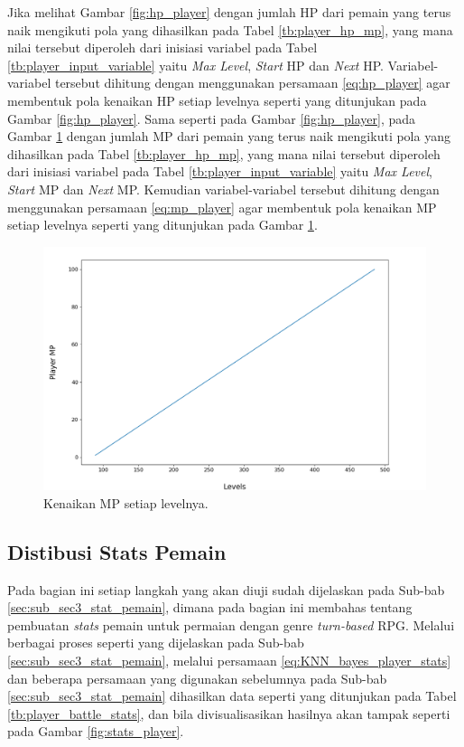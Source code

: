 Jika melihat Gambar \ref{fig:hp_player} dengan jumlah HP dari pemain yang terus naik mengikuti pola yang dihasilkan pada Tabel \ref{tb:player_hp_mp}, yang mana nilai tersebut diperoleh dari inisiasi variabel pada Tabel \ref{tb:player_input_variable} yaitu \textit{Max Level}, \textit{Start} HP dan \textit{Next} HP. Variabel-variabel tersebut dihitung dengan menggunakan persamaan \ref{eq:hp_player} agar membentuk pola kenaikan HP setiap levelnya seperti yang ditunjukan pada Gambar \ref{fig:hp_player}. Sama seperti pada Gambar \ref{fig:hp_player}, pada Gambar \ref{fig:mp_player} dengan jumlah MP dari pemain yang terus naik mengikuti pola yang dihasilkan pada Tabel \ref{tb:player_hp_mp}, yang mana nilai tersebut diperoleh dari inisiasi variabel pada Tabel \ref{tb:player_input_variable} yaitu \textit{Max Level}, \textit{Start} MP dan \textit{Next} MP. Kemudian variabel-variabel tersebut dihitung dengan menggunakan persamaan \ref{eq:mp_player} agar membentuk pola kenaikan MP setiap levelnya seperti yang ditunjukan pada Gambar \ref{fig:mp_player}.

\begin{figure} [!h] \centering
	\includegraphics[scale=0.45]{img/PlayerMpDistrib.png}
	\caption{Kenaikan MP setiap levelnya.}
	\label{fig:mp_player}
\end{figure}
\vspace{1ex}

\subsection{Distibusi Stats Pemain}
\label{sec:sub_sec4_pengujian_player_stats}
\vspace{1ex}

Pada bagian ini setiap langkah yang akan diuji sudah dijelaskan pada Sub-bab \ref{sec:sub_sec3_stat_pemain}, dimana pada bagian ini membahas tentang pembuatan \textit{stats} pemain untuk permaian dengan genre \textit{turn-based} RPG. Melalui berbagai proses seperti yang dijelaskan pada Sub-bab \ref{sec:sub_sec3_stat_pemain}, melalui persamaan \ref{eq:KNN_bayes_player_stats} dan beberapa persamaan yang digunakan sebelumnya pada Sub-bab \ref{sec:sub_sec3_stat_pemain} dihasilkan data seperti yang ditunjukan pada Tabel \ref{tb:player_battle_stats}, dan bila divisualisasikan hasilnya akan tampak seperti pada Gambar \ref{fig:stats_player}.

